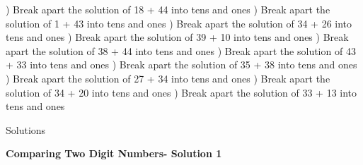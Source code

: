 \documentclass{article}%
\begin{document}
\newline%
) Break apart the solution of 18 + 44 into tens and ones%
\newline%
\newline%
) Break apart the solution of 1 + 43 into tens and ones%
\newline%
\newline%
) Break apart the solution of 34 + 26 into tens and ones%
\newline%
\newline%
) Break apart the solution of 39 + 10 into tens and ones%
\newline%
\newline%
) Break apart the solution of 38 + 44 into tens and ones%
\newline%
\newline%
) Break apart the solution of 43 + 33 into tens and ones%
\newline%
\newline%
) Break apart the solution of 35 + 38 into tens and ones%
\newline%
\newline%
) Break apart the solution of 27 + 34 into tens and ones%
\newline%
\newline%
) Break apart the solution of 34 + 20 into tens and ones%
\newline%
\newline%
) Break apart the solution of 33 + 13 into tens and ones%
\newline%
\newline%
\newline%
\pagebreak%
\huge%
\vspace*{\fill}%
\begin{center}%
Solutions%
\end{center}%
\vspace*{\fill}%
\normalsize%
\pagebreak%
\large%
\begin{center}%
\textbf{Comparing Two Digit Numbers- Solution 1}%
\newline%
\end{center} \normalsize%
\end{document}
